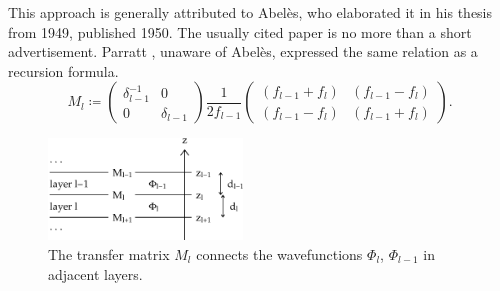 {This approach is generally attributed to Abelès,
%
who elaborated it in his thesis from 1949, published 1950.
The usually cited paper \cite{Abe50a} is no more than a short advertisement.
Parratt \cite{Par54}, unaware of Abelès, expressed the same relation as a recursion formula.%
%
}
\begin{equation}\label{EMil}
  M_l
   \coloneqq
   \left(\begin{array}{cc}
     \delta_{l-1}^{-1}&0\\
       0 & \delta_{l-1}
   \end{array}\right)
   \frac{1}{2f_{l-1}}
   \left(\begin{array}{cc}
       (f_{l-1}+f_l)&(f_{l-1}-f_l)\\
       (f_{l-1}-f_l)&(f_{l-1}+f_l)
   \end{array}\right).
\end{equation}

\begin{figure}[tb]
\begin{center}
\includegraphics[width=0.46\textwidth]{fig/drawing/multilayer_boundary.ps}
\end{center}
\caption{The transfer matrix $M_l$ connects the wavefunctions
%
%
%
$\Phi_l$, $\Phi_{l-1}$ in adjacent layers.}
\label{Fboundary}
\end{figure}

